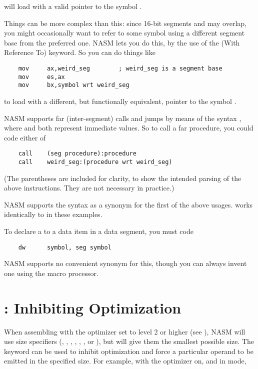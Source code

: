 will load  with a valid pointer to the symbol
.

Things can be more complex than this: since 16-bit segments and
 may overlap,
you might occasionally want to refer to some symbol using
a different segment base from the preferred one. NASM lets you
do this, by the use of the  (With Reference To) keyword.
So you can do things like

\begin{lstlisting}
	mov     ax,weird_seg        ; weird_seg is a segment base
	mov     es,ax
	mov     bx,symbol wrt weird_seg
\end{lstlisting}

to load  with a different, but functionally equivalent,
pointer to the symbol .

NASM supports far (inter-segment) calls and jumps by means of the
syntax , where 
and  both represent immediate values. So to call
a far procedure, you could code either of

\begin{lstlisting}
	call    (seg procedure):procedure
	call    weird_seg:(procedure wrt weird_seg)
\end{lstlisting}

(The parentheses are included for clarity, to show the intended
parsing of the above instructions. They are not necessary in
practice.)

NASM supports the syntax 
as a synonym for the first of the above usages.  works
identically to  in these examples.

To declare a  to a data item in a data
segment, you must code

\begin{lstlisting}
	dw      symbol, seg symbol
\end{lstlisting}

NASM supports no convenient synonym for this, though you can always
invent one using the macro processor.

\section{: Inhibiting Optimization}
\label{sec:strict}

When assembling with the optimizer set to level 2 or higher (see
), NASM will use size specifiers (,
, , , , ,
 or ), but will give them the smallest possible
size. The keyword  can be used to inhibit optimization
and force a particular operand to be emitted in the specified size.
For example, with the optimizer on, and in  mode,

